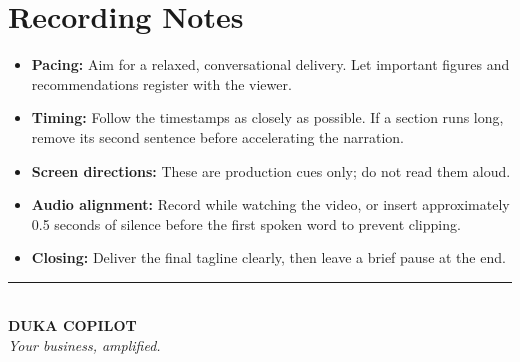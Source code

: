 \documentclass[11pt,a4paper]{article}
\begin{document}
\newpage
\section*{Recording Notes}

\begin{itemize}
    \item \textbf{Pacing:} Aim for a relaxed, conversational
    delivery. Let important figures and recommendations
    register with the viewer.

    \item \textbf{Timing:} Follow the timestamps as closely
    as possible. If a section runs long, remove its second
    sentence before accelerating the narration.

    \item \textbf{Screen directions:} These are production
    cues only; do not read them aloud.

    \item \textbf{Audio alignment:} Record while watching
    the video, or insert approximately 0.5 seconds of silence
    before the first spoken word to prevent clipping.

    \item \textbf{Closing:} Deliver the final tagline clearly,
    then leave a brief pause at the end.
\end{itemize}

\vfill

\begin{center}
    \textcolor{dukablue}{\rule{0.6\textwidth}{0.6pt}}\\[0.5em]
    \textbf{DUKA COPILOT}\\
    \textit{Your business, amplified.}
\end{center}
\end{document}
